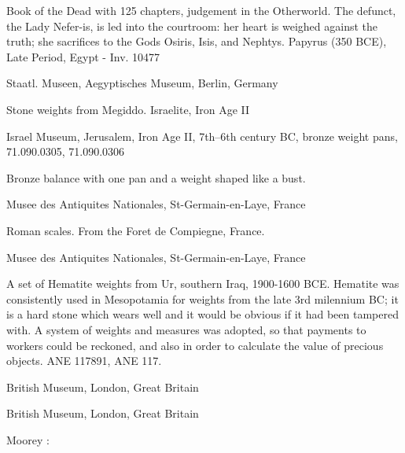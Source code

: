 \documentclass{article}
\begin{document}
Book of the Dead with 125 chapters, judgement in the Otherworld. The defunct, the Lady Nefer-is, is led into the courtroom: her heart is weighed against the truth; she sacrifices to the Gods Osiris, Isis, and Nephtys. Papyrus (350 BCE), Late Period, Egypt - Inv. 10477 

Staatl. Museen, Aegyptisches Museum, Berlin, Germany

Stone weights from Megiddo. Israelite, Iron Age II 

Israel Museum, Jerusalem, Iron Age II, 7th--6th century BC, bronze weight pans, 
71.090.0305, 71.090.0306

Bronze balance with one pan and a weight shaped like a bust. 

Musee des Antiquites Nationales, St-Germain-en-Laye, France

Roman scales. From the Foret de Compiegne, France. 

Musee des Antiquites Nationales, St-Germain-en-Laye, France

A set of Hematite weights from Ur, southern Iraq, 1900-1600 BCE. Hematite was consistently used in Mesopotamia for weights from the late 3rd milennium BC; it is a hard stone which wears well and it would be obvious if it had been tampered with. A system of weights and measures was adopted, so that payments to workers could be reckoned, and also in order to calculate the value of precious objects. ANE 117891, ANE 117. 

British Museum, London, Great Britain

British Museum, London, Great Britain

Moorey \cite[p.~4]{moorey}:
\end{document}
